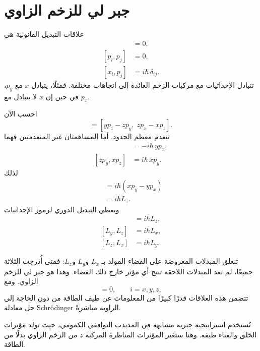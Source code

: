 \section{جبر لي للزخم الزاوي}

علاقات التبديل القانونية هي
\begin{align}
[x_i,x_j]&=0,\\
[p_i,p_j]&=0,\\
[x_i,p_j]&=i\hbar\,\delta_{ij}.
\end{align}
تتبادل الإحداثيات مع مركبات الزخم العائدة إلى اتجاهات مختلفة. فمثلًا، يتبادل \(x\) مع \(p_y\)، في حين إن \(x\) لا يتبادل مع \(p_x\).

احسب الآن
\begin{equation}
[L_x,L_y]
=
[yp_z-zp_y,\;zp_x-xp_z].
\end{equation}
تنعدم معظم الحدود. أما المساهمتان غير المنعدمتين فهما
\begin{align}
[yp_z,zp_x]&=-i\hbar\,yp_x,\\
[zp_y,xp_z]&=i\hbar\,xp_y.
\end{align}
لذلك
\begin{align}
[L_x,L_y]
&=i\hbar\left(xp_y-yp_x\right)\\
&=i\hbar L_z.
\end{align}
ويعطي التبديل الدوري لرموز الإحداثيات
\begin{align}
[L_x,L_y]&=i\hbar L_z,\\
[L_y,L_z]&=i\hbar L_x,\\
[L_z,L_x]&=i\hbar L_y.
\end{align}

\begin{classroomqa}
\end{classroomqa}

تنغلق المبدلات المعروضة على الفضاء المولد بـ \(L_x\) و\(L_y\) و\(L_z\): فمتى أُدرجت الثلاثة جميعًا، لم تعد المبدلات اللاحقة تنتج أي مؤثر خارج ذلك الفضاء. وهذا هو جبر لي للزخم الزاوي. ومع
\begin{equation}
[H,L_i]=0,
\qquad i=x,y,z,
\end{equation}
تتضمن هذه العلاقات قدرًا كبيرًا من المعلومات عن طيف الطاقة من دون الحاجة إلى حل معادلة Schr\"odinger الزاوية مباشرةً.

تُستخدم استراتيجية جبرية مشابهة في المذبذب التوافقي الكمومي، حيث تولد مؤثرات الخلق والفناء طيفه. وهنا ستغير المؤثرات المناظرة المركبة \(z\) من الزخم الزاوي بدلًا من الطاقة.

